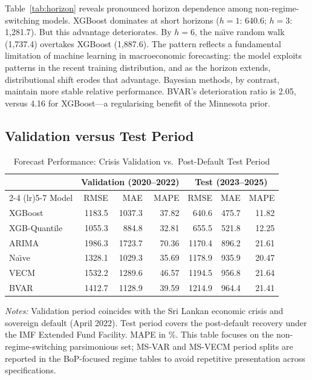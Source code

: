 \documentclass[12pt,a4paper]{article}
\begin{document}
Table~\ref{tab:horizon} reveals pronounced horizon dependence among non-regime-switching models. XGBoost dominates at short horizons ($h=1$: 640.6; $h=3$: 1,281.7). But this advantage deteriorates. By $h=6$, the na\"{\i}ve random walk (1,737.4) overtakes XGBoost (1,887.6). The pattern reflects a fundamental limitation of machine learning in macroeconomic forecasting: the model exploits patterns in the recent training distribution, and as the horizon extends, distributional shift erodes that advantage. Bayesian methods, by contrast, maintain more stable relative performance. BVAR's deterioration ratio is 2.05, versus 4.16 for XGBoost---a regularising benefit of the Minnesota prior.

\subsection{Validation versus Test Period}

\begin{table}[htbp]
\centering
\caption{Forecast Performance: Crisis Validation vs.\ Post-Default Test Period}
\label{tab:val_vs_test}
\begin{tabular}{lrrr@{\hskip 12pt}rrr}
\toprule
& \multicolumn{3}{c}{Validation (2020--2022)} & \multicolumn{3}{c}{Test (2023--2025)} \\
\cmidrule(lr){2-4} \cmidrule(lr){5-7}
Model & RMSE & MAE & MAPE & RMSE & MAE & MAPE \\
\midrule
XGBoost & 1183.5 & 1037.3 & 37.82 & 640.6 & 475.7 & 11.82 \\
XGB-Quantile & 1055.3 & 884.8 & 32.81 & 655.5 & 521.8 & 12.25 \\
ARIMA & 1986.3 & 1723.7 & 70.36 & 1170.4 & 896.2 & 21.61 \\
Na\"{\i}ve & 1328.1 & 1029.3 & 35.69 & 1178.9 & 935.9 & 20.47 \\
VECM & 1532.2 & 1289.6 & 46.57 & 1194.5 & 956.8 & 21.64 \\
BVAR & 1412.7 & 1128.9 & 39.59 & 1214.9 & 964.4 & 21.41 \\
\bottomrule
\end{tabular}
\begin{tablenotes}
\small
\item \textit{Notes:} Validation period coincides with the Sri Lankan economic crisis and sovereign default (April 2022). Test period covers the post-default recovery under the IMF Extended Fund Facility. MAPE in \%. This table focuses on the non-regime-switching parsimonious set; MS-VAR and MS-VECM period splits are reported in the BoP-focused regime tables to avoid repetitive presentation across specifications.
\end{tablenotes}
\end{table}
\end{document}
